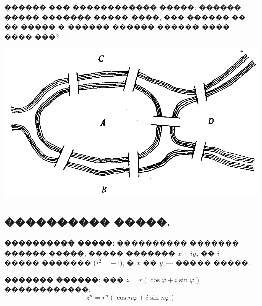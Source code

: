 \documentclass[a4paper,12pt]{article}
\begin{document}
\begin{enumerate}
\begin{minipage}{.35\textwidth}
       \item ������ ��� ������������ �����: ������ ����� ������� ����� ����, ��� ������ �� �� ����� � ������ ������ ������ ���� ���� ���?
\end{minipage}
\begin{minipage}{.55\textwidth}
\begin{center}
      \includegraphics[scale=0.3]{10_01}
\end{center}
\end{minipage}


\end{enumerate}








\newpage

\begin{center}
\section*{���������� �����.}
\end{center}

\textbf{���������� �����}: ���������� ������� ������ �����, ����� ������� $x+iy$, �� $i$~--- ����� ������� ($i^{2}=-1$), � $x$ �� $y$~--- ����� �����.

\textbf{������� ������}: ��� $z=r(\cos \varphi + i\sin \varphi)$ ������������: $$z^{n}=r^{n}(\cos n\varphi + i\sin n\varphi)$$

\medskip\medskip\medskip
\end{document}

